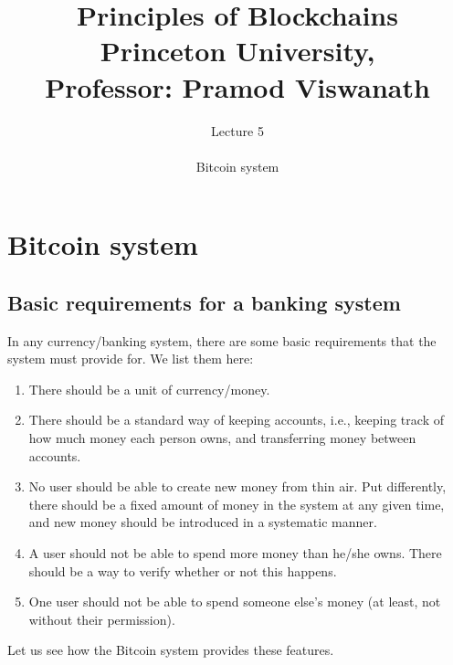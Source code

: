 \documentclass{report}
\title{\Huge{Principles of Blockchains \\ Princeton University,\\
		Professor: Pramod Viswanath}}
\author{\huge{Lecture 5} \\\\ Bitcoin system}
\begin{document}
\maketitle
\newpage%
\tableofcontents
\pagebreak

\chapter{Bitcoin system}

\section{Basic requirements for a banking system}

In any currency/banking system, there are some basic requirements that the system must provide for. We list them here:
\begin{enumerate}
	\item There should be a unit of currency/money.
	\item There should be a standard way of keeping accounts, i.e., keeping track of how much money each person owns, and transferring money between accounts.
	\item No user should be able to create new money from thin air. Put diﬀerently, there should be a
	fixed amount of money in the system at any given time, and new money should be introduced in a systematic manner.
	\item A user should not be able to spend more money than he/she owns. There should be a way to verify whether or not this happens.
	\item One user should not be able to spend someone else’s money (at least, not without their permission).
	 
\end{enumerate}
Let us see how the Bitcoin system provides these features.
\end{document}
